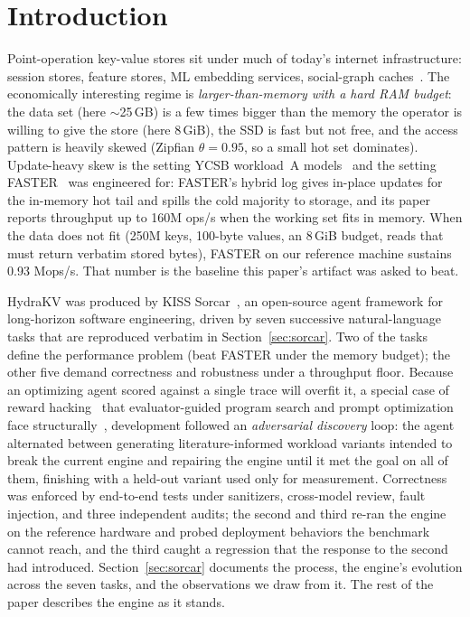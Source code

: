\documentclass{article}
\newcommand{\FASTERBase}{0.93}          %
\newcommand{\NKeysShort}{250M}
\newcommand{\ValueBytes}{100}
\newcommand{\MemBudget}{8\,GiB}
\newcommand{\DataSize}{$\sim$25\,GB}
\begin{document}
\section{Introduction}
\label{sec:intro}

Point-operation key-value stores sit under much of today's internet infrastructure: session stores, feature stores, ML embedding services, social-graph caches~\cite{cachelib,cao-fast20,yang-osdi20}. The economically interesting regime is \emph{larger-than-memory with a hard RAM budget}: the data set (here \DataSize) is a few times bigger than the memory the operator is willing to give the store (here \MemBudget), the SSD is fast but not free, and the access pattern is heavily skewed (Zipfian $\theta=0.95$, so a small hot set dominates). Update-heavy skew is the setting YCSB workload~A models~\cite{ycsb} and the setting FASTER~\cite{faster} was engineered for: FASTER's hybrid log gives in-place updates for the in-memory hot tail and spills the cold majority to storage, and its paper reports throughput up to 160M ops/s when the working set fits in memory. When the data does not fit (\NKeysShort{} keys, \ValueBytes-byte values, an \MemBudget{} budget, reads that must return verbatim stored bytes), FASTER on our reference machine sustains \FASTERBase{} Mops/s. That number is the baseline this paper's artifact was asked to beat.

HydraKV was produced by KISS Sorcar~\cite{kisssorcar}, an open-source agent framework for long-horizon software engineering, driven by seven successive natural-language tasks that are reproduced verbatim in Section~\ref{sec:sorcar}. Two of the tasks define the performance problem (beat FASTER under the memory budget); the other five demand correctness and robustness under a throughput floor. Because an optimizing agent scored against a single trace will overfit it, a special case of reward hacking~\cite{rewardhacking} that evaluator-guided program search and prompt optimization face structurally~\cite{alphadev,funsearch,alphaevolve,gepa}, development followed an \emph{adversarial discovery} loop: the agent alternated between generating literature-informed workload variants intended to break the current engine and repairing the engine until it met the goal on all of them, finishing with a held-out variant used only for measurement. Correctness was enforced by end-to-end tests under sanitizers, cross-model review, fault injection, and three independent audits; the second and third re-ran the engine on the reference hardware and probed deployment behaviors the benchmark cannot reach, and the third caught a regression that the response to the second had introduced. Section~\ref{sec:sorcar} documents the process, the engine's evolution across the seven tasks, and the observations we draw from it. The rest of the paper describes the engine as it stands.
\end{document}
